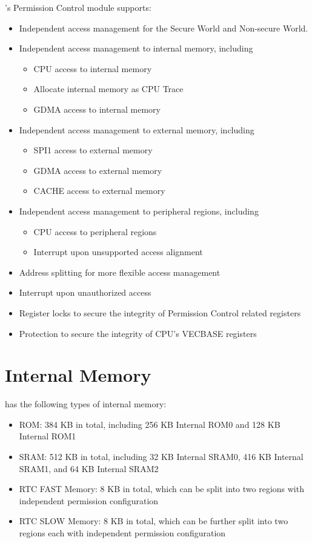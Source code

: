 \documentclass[main\_\_EN.tex]{subfiles}
\begin{document}
\chipname{}'s Permission Control module supports:
\begin{itemize}
    \item Independent access management for the Secure World and Non-secure World.
    \item Independent access management to internal memory, including
    \begin{itemize}
        \item CPU access to internal memory
        \item Allocate internal memory as CPU Trace
        \item GDMA access to internal memory
    \end{itemize}
    \item Independent access management to external memory, including
    \begin{itemize}
        \item SPI1 access to external memory
        \item GDMA access to external memory
        \item CACHE access to external memory
    \end{itemize}
    \item Independent access management to peripheral regions, including
    \begin{itemize}
        \item CPU access to peripheral regions
        \item Interrupt upon unsupported access alignment
    \end{itemize}
    \item Address splitting for more flexible access management
    \item Interrupt upon unauthorized access
    \item Register locks to secure the integrity of Permission Control related registers
    \item Protection to secure the integrity of CPU's VECBASE registers
\end{itemize}
\section{Internal Memory}

\chipname{} has the following types of internal memory:
\begin{itemize}
    \item ROM: 384 KB in total, including 256 KB Internal ROM0 and 128 KB Internal ROM1
    \item SRAM: 512 KB in total, including 32 KB Internal SRAM0, 416 KB Internal SRAM1, and 64 KB Internal SRAM2
    \item RTC FAST Memory: 8 KB in total, which can be split into two regions with independent permission configuration
    \item RTC SLOW Memory: 8 KB in total, which can be further split into two regions each with independent permission configuration
\end{itemize}
\end{document}

